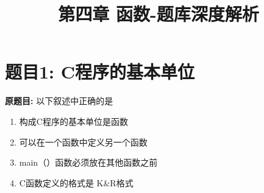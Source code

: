\documentclass[a4paper,12pt]{article}
\title{\textbf{第四章 函数-题库深度解析}}
\author{}
\date{}
\begin{document}
\maketitle

\tableofcontents
\newpage

\section*{题目1: C程序的基本单位}

\textbf{原题目:}
以下叙述中正确的是
\begin{enumerate}
	\item[A)] 构成C程序的基本单位是函数
	\item[B)] 可以在一个函数中定义另一个函数
	\item[C)] main（）函数必须放在其他函数之前
	\item[D)] C函数定义的格式是 K\&R格式
\end{enumerate}
\end{document}
